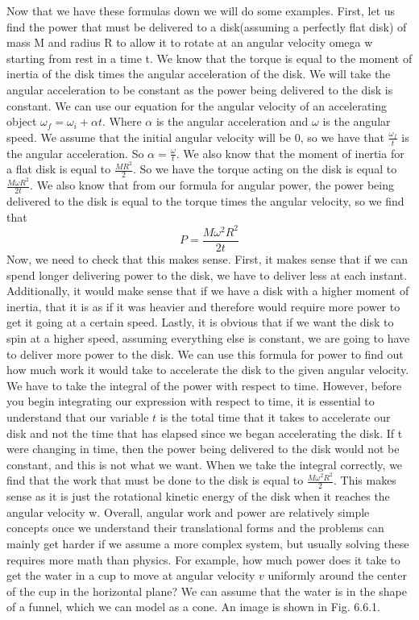 Now that we have these formulas down we will do some examples. 
First, let us find the power that must be delivered to a disk(assuming a perfectly flat disk) of mass M and radius R to allow it to rotate at an angular velocity omega w starting from rest in a time t. We know that the torque is equal to the moment of inertia of the disk times the angular acceleration of the disk. We will take the angular acceleration to be constant as the power being delivered to the disk is constant. We can use our equation for the angular velocity of an accelerating object $\omega_f=\omega_i+\alpha t$. Where $\alpha$ is the angular acceleration and $\omega$ is the angular speed. We assume that the initial angular velocity will be 0, so we have that $\frac{\omega_f}{t}$ is the angular acceleration. So $\alpha =\frac{\omega}{t}$. We also know that the moment of inertia for a flat disk is equal to $\frac{MR^2}{2}$. So we have the torque acting on the disk is equal to $\frac{M\omega R^2}{2t}$. We also know that from our formula for angular power, the power being delivered to the disk is equal to the torque times the angular velocity, so we find that \begin{equation}P = \frac{M\omega^2 R^2}{2t}\end{equation} Now, we need to check that this makes sense. First, it makes sense that if we can spend longer delivering power to the disk, we have to deliver less at each instant. Additionally, it would make sense that if we have a disk with a higher moment of inertia, that it is as if it was heavier and therefore would require more power to get it going at a certain speed. Lastly, it is obvious that if we want the disk to spin at a higher speed, assuming everything else is constant, we are going to have to deliver more power to the disk. We can use this formula for power to find out how much work it would take to accelerate the disk to the given angular velocity. We have to take the integral of the power with respect to time. However, before you begin integrating our expression with respect to time, it is essential to understand that our variable $t$ is the total time that it takes to accelerate our disk and not the time that has elapsed since we began accelerating the disk. If t were changing in time, then the power being delivered to the disk would not be constant, and this is not what we want. When we take the integral correctly, we find that the work that must be done to the disk is equal to $\frac{M\omega^2R^2}{2}$. This makes sense as it is just the rotational kinetic energy of the disk when it reaches the angular velocity w. Overall, angular work and power are relatively simple concepts once we understand their translational forms and the problems can mainly get harder if we assume a more complex system, but usually solving these requires more math than physics. For example, how much power does it take to get the water in a cup to move at angular velocity $v$ uniformly around the center of the cup in the horizontal plane? We can assume that the water is in the shape of a funnel, which we can model as a cone. An image is shown in Fig. 6.6.1.
